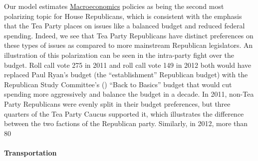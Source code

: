 Our model estimates \underline{Macroeconomics} policies as being the second most polarizing topic for House Republicans, which is consistent with the emphasis that the Tea Party places on issues like a balanced budget and reduced federal spending. Indeed, we see that Tea Party Republicans have distinct preferences on these types of issues as compared to more mainstream Republican legislators. An illustration of this polarization can be seen in the intra-party fight over the budget. Roll call vote 275 in 2011 and roll call vote 149 in 2012 both would have replaced Paul Ryan's budget (the ``establishment'' Republican budget) with the Republican Study Committee's () ``Back to Basics'' budget that would cut spending more aggressively and balance the budget in a decade. In 2011, non-Tea Party Republicans were evenly split in their budget preferences, but three quarters of the Tea Party Caucus supported it, which illustrates the difference between the two factions of the Republican party. Similarly, in 2012, more than 80\





\paragraph{Transportation}
























